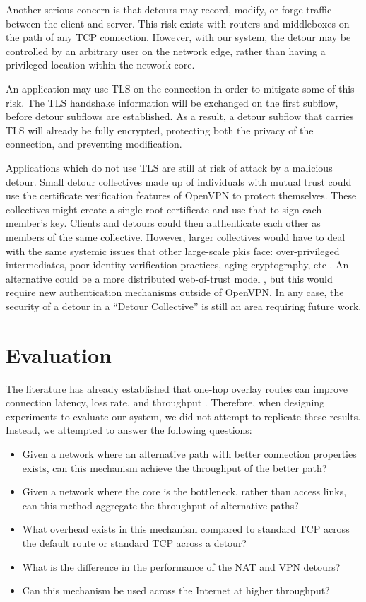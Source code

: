 \documentclass{cwru}
\begin{document}
Another serious concern is that detours may record, modify, or forge traffic
between the client and server. This risk exists with routers and middleboxes on
the path of any TCP connection. However, with our system, the detour may be
controlled by an arbitrary user on the network edge, rather than having a
privileged location within the network core.

An application may use TLS on the connection in order to mitigate some of this
risk. The TLS handshake information will be exchanged on the first subflow,
before detour subflows are established. As a result, a detour subflow that
carries TLS will already be fully encrypted, protecting both the privacy of the
connection, and preventing modification.

Applications which do not use TLS are still at risk of attack by a malicious
detour. Small detour collectives made up of individuals with mutual trust could
use the certificate verification features of OpenVPN to protect themselves.
These collectives might create a single root certificate and use that to sign
each member's key. Clients and detours could then authenticate each other as
members of the same collective. However, larger collectives would have to deal
with the same systemic issues that other large-scale \acp{pki} face:
over-privileged intermediates, poor identity verification practices, aging
cryptography, etc \cite{durumeric2013analysis}. An alternative could be a more
distributed web-of-trust model \cite{abdul1997pgp}, but this would require new
authentication mechanisms outside of OpenVPN. In any case, the security of a
detour in a ``Detour Collective'' is still an area requiring future work.

\chapter{Evaluation}
\label{c:eval}

The literature has already established that one-hop overlay routes can improve
connection latency, loss rate, and throughput
\cite{detour,ron,gummadi2004improving}. Therefore, when designing experiments to
evaluate our system, we did not attempt to replicate these results. Instead, we
attempted to answer the following questions:

\begin{itemize}
\item Given a network where an alternative path with better connection
  properties exists, can this mechanism achieve the throughput of the better
  path?
\item Given a network where the core is the bottleneck, rather than access
  links, can this method aggregate the throughput of alternative paths?
\item What overhead exists in this mechanism compared to standard TCP across the
  default route or standard TCP across a detour?
\item What is the difference in the performance of the NAT and VPN detours?
\item Can this mechanism be used across the Internet at higher throughput?
\end{itemize}
\end{document}
